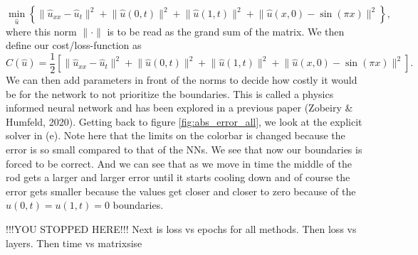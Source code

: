 \begin{equation*}
    \min_{\hat{u}} \left\{
    \lVert \hat u_{xx} - \hat u_t \rVert^2 
    + \lVert \hat u(0,t) \rVert^2 
    + \lVert \hat u(1,t) \rVert^2
    + \lVert \hat u(x,0)-\sin{(\pi x)}\rVert^2 \right\},
\end{equation*}
where this norm $\lVert \cdot \rVert$ is to be read as the grand sum of the
matrix. We then define our cost/loss-function as
\begin{equation*}
    C(\hat u) =\frac{1}{2} \left[ \lVert \hat u_{xx} - \hat u_t \rVert^2 
    + \lVert \hat u(0,t) \rVert^2 
    + \lVert \hat u(1,t) \rVert^2
    + \lVert \hat u(x,0)-\sin{(\pi x)}\rVert^2 \right].
\end{equation*}
We can then add parameters in front of the norms to decide how costly it would
be for the network to not prioritize the boundaries. This is called a physics
informed neural network and has been explored in a previous paper (Zobeiry \&
Humfeld, 2020)\cite{2}. Getting back to figure \ref{fig:abs_error_all}, we look
at the explicit solver in (e). Note here that the limits on the colorbar is
changed because the error is so small compared to that of the NNs. We see that
now our boundaries is forced to be correct. And we can see that as we move in
time the middle of the rod gets a larger and larger error until it starts
cooling down and of course the error gets smaller because the values get closer
and closer to zero because of the $u(0,t)=u(1,t)=0$ boundaries.

!!!YOU STOPPED HERE!!! Next is loss vs epochs for all methods. Then loss vs
layers. Then time vs matrixsise


